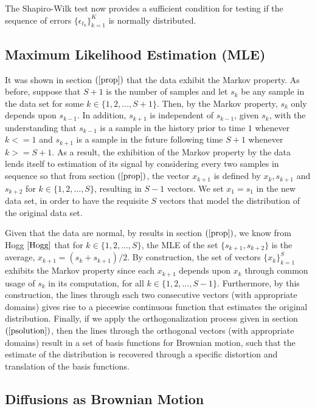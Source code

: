 \documentclass[11pt]{imsart}
\begin{document}
\noindent
The Shapiro-Wilk test now provides a sufficient condition for testing if the sequence of errors $\{\epsilon_{t_{k}}\}_{k = 1}^{K}$ is normally distributed.

\subsection{Maximum Likelihood Estimation (MLE)}
\label{mle}

It was shown in section $(\ref{prop})$ that the data exhibit the Markov property.  As before, suppose that $S+1$ is the number of samples and let $s_{k}$ be any sample in the data set for some $k \in \{1,2,...,S+1\}$.  Then, by the Markov property, $s_{k}$ only depends upon $s_{k-1}$.  In addition, $s_{k+1}$ is independent of $s_{k-1}$, given $s_{k}$, with the understanding that $s_{k-1}$ is a sample in the history prior to time $1$ whenever $k <= 1$ and $s_{k+1}$ is a sample in the future following time $S+1$ whenever $k >= S+1$.  As a result, the exhibition of the Markov property by the data lends itself to estimation of its signal by considering every two samples in sequence so that from section $(\ref{prop})$, the vector $x_{k+1}$ is defined by $x_{k},s_{k+1}$ and $s_{k+2}$ for $k \in \{1,2,...,S\}$, resulting in $S-1$ vectors.  We set $x_{1}=s_{1}$ in the new data set, in order to have the requisite $S$ vectors that model the distribution of the original data set.

Given that the data are normal, by results in section $(\ref{prop})$, we know from Hogg $\cite{Hogg}$ that for $k \in \{1,2,...,S\}$, the MLE of the set $\{s_{k+1},s_{k+2}\}$ is the average, $x_{k+1}=(s_{k}+s_{k+1})/2$.  By construction, the set of vectors $\{x_{k}\}_{k=1}^{S}$ exhibits the Markov property since each $x_{k+1}$ depends upon $x_{k}$ through common usage of $s_{k}$ in its computation, for all $k \in \{1,2,...,S-1\}$.  Furthermore, by this construction, the lines through each two consecutive vectors (with appropriate domains) gives rise to a piecewise continuous function that estimates the original distribution.  Finally, if we apply the orthogonalization process given in section $(\ref{psolution})$, then the lines through the orthogonal vectors (with appropriate domains) result in a set of basis functions for Brownian motion, such that the estimate of the distribution is recovered through a specific distortion and translation of the basis functions.

\subsection{Diffusions as Brownian Motion}
\label{dbm}
\end{document}
